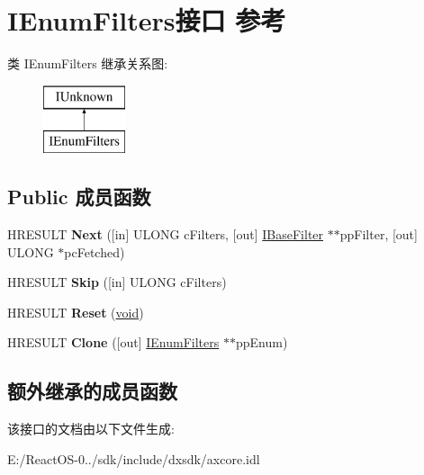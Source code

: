 \hypertarget{interface_i_enum_filters}{}\section{I\+Enum\+Filters接口 参考}
\label{interface_i_enum_filters}
类 I\+Enum\+Filters 继承关系图\+:\begin{figure}[H]
\begin{center}
\leavevmode
\includegraphics[height=2.000000cm]{interface_i_enum_filters}
\end{center}
\end{figure}
\subsection*{Public 成员函数}
\begin{DoxyCompactItemize}
\item 
\mbox{\label{interface_i_enum_filters_a6968c1a05989b16b231f20a1a61802e3}} 
H\+R\+E\+S\+U\+LT {\bfseries Next} (\mbox{[}in\mbox{]} U\+L\+O\+NG c\+Filters, \mbox{[}out\mbox{]} \hyperlink{interface_i_base_filter}{I\+Base\+Filter} $\ast$$\ast$pp\+Filter, \mbox{[}out\mbox{]} U\+L\+O\+NG $\ast$pc\+Fetched)
\item 
\mbox{\label{interface_i_enum_filters_a2c1cdc3bfd4203510e190b641e7f4c86}} 
H\+R\+E\+S\+U\+LT {\bfseries Skip} (\mbox{[}in\mbox{]} U\+L\+O\+NG c\+Filters)
\item 
\mbox{\label{interface_i_enum_filters_a2f14f0a91954a930e8849b2fedba9dec}} 
H\+R\+E\+S\+U\+LT {\bfseries Reset} (\hyperlink{interfacevoid}{void})
\item 
\mbox{\label{interface_i_enum_filters_a0c567f7890842d41f983d2f81a24b098}} 
H\+R\+E\+S\+U\+LT {\bfseries Clone} (\mbox{[}out\mbox{]} \hyperlink{interface_i_enum_filters}{I\+Enum\+Filters} $\ast$$\ast$pp\+Enum)
\end{DoxyCompactItemize}
\subsection*{额外继承的成员函数}


该接口的文档由以下文件生成\+:\begin{DoxyCompactItemize}
\item 
E\+:/\+React\+O\+S-\/0../sdk/include/dxsdk/axcore.\+idl\end{DoxyCompactItemize}
